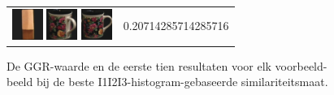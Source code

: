 \begin{figure}[tbp]
\begin{center}
\begin{tabular}{m{11cm} | m{3cm} |}
\includegraphics[width=1cm]{coil/beeld-44.eps}
\includegraphics[width=1cm]{coil/beeld-64.eps}
\includegraphics[width=1cm]{coil/beeld-60.eps}
& {\scriptsize 0.20714285714285716}
\end{tabular}
\caption{\label{fig:results_i1i2i3_histgeb}De GGR-waarde en de eerste tien resultaten voor elk voorbeeld-beeld bij de beste I1I2I3-histogram-gebaseerde similariteitsmaat.}
\end{center}
\end{figure}

